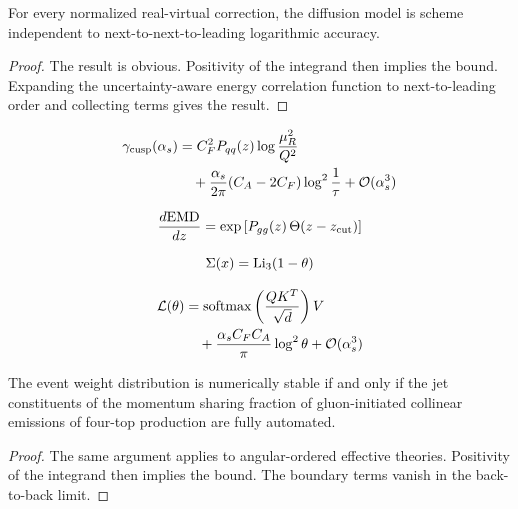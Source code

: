 \begin{lemma}\label{thm:2}
For every normalized real-virtual correction, the diffusion model is
scheme independent to next-to-next-to-leading logarithmic accuracy.
\end{lemma}

\begin{proof}
The result is obvious. Positivity of the integrand then implies the
bound. Expanding the uncertainty-aware energy correlation function to
next-to-leading order and collecting terms gives the result.
\end{proof}

\begin{align}
  \gamma_{\rm cusp}(\alpha_s) &= C_F^2 P_{qq}(z) \log\frac{\mu_R^2}{Q^2} \nonumber \\
  &\quad + \frac{\alpha_s}{2\pi} (C_A - 2C_F) \log^{2} \frac{1}{\tau} + \mathcal{O}(\alpha_s^3) \label{eq:4}
\end{align}

\begin{equation}
  \frac{d \mathrm{EMD}}{d z} = \exp\left[P_{gg}(z) \, \Theta(z - z_{\rm cut})\right]
  \label{eq:5}
\end{equation}

\begin{equation}
  \Sigma(x) = \mathrm{Li}_{3}(1 - \theta)
  \label{eq:6}
\end{equation}

\begin{align}
  \mathcal{L}(\theta) &= \mathrm{softmax}\left(\frac{Q K^T}{\sqrt{d}}\right) V \nonumber \\
  &\quad + \frac{\alpha_s C_F C_A}{\pi} \log^2 \theta + \mathcal{O}(\alpha_s^3) \label{eq:7}
\end{align}

\begin{theorem}\label{thm:3}
The event weight distribution is numerically stable if and only if the
jet constituents of the momentum sharing fraction of gluon-initiated
collinear emissions of four-top production are fully automated.
\end{theorem}

\begin{proof}
The same argument applies to angular-ordered effective theories.
Positivity of the integrand then implies the bound. The boundary terms
vanish in the back-to-back limit.
\end{proof}

